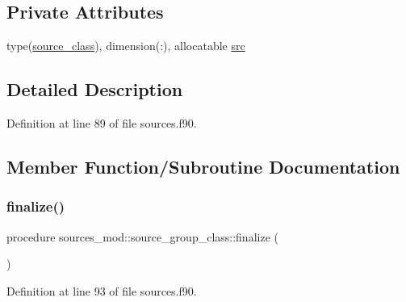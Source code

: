\subsection*{Private Attributes}
\begin{DoxyCompactItemize}
\item 
type(\mbox{\hyperlink{structsources__mod_1_1source__class}{source\+\_\+class}}), dimension(\+:), allocatable \mbox{\hyperlink{structsources__mod_1_1source__group__class_af970ce2c935528f707bdbf4169995d7c}{src}}
\end{DoxyCompactItemize}


\subsection{Detailed Description}


Definition at line 89 of file sources.\+f90.



\subsection{Member Function/\+Subroutine Documentation}
\mbox{\label{structsources__mod_1_1source__group__class_ab1f12af6502f7e468e07d82555ea5cb9}} 
\subsubsection{\texorpdfstring{finalize()}{finalize()}}
{\footnotesize\ttfamily procedure sources\+\_\+mod\+::source\+\_\+group\+\_\+class\+::finalize (\begin{DoxyParamCaption}{ }\end{DoxyParamCaption})\hspace{0.3cm}{\ttfamily [private]}}



Definition at line 93 of file sources.\+f90.

\mbox{\label{structsources__mod_1_1source__group__class_a186abc677118adbf1f9cff405dac330e}} 
